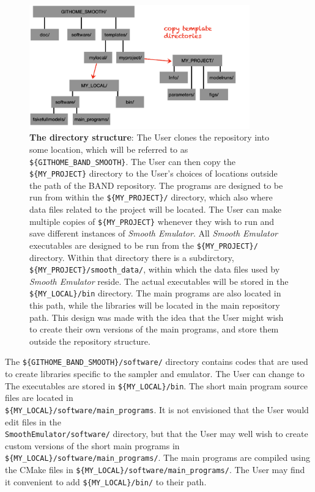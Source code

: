 \documentclass[UserManual.tex]{subfiles}
\begin{document}
\begin{figure}
\centerline{\includegraphics[width = 0.85\textwidth]{figs/directorystructure}}
\caption{{\bf The directory structure}: The User clones the repository into some location, which will be referred to as {\tt \$\{\tt GITHOME\_BAND\_SMOOTH\}}. The User can then copy the {\tt  \$\{MY\_PROJECT\}} directory to the User's choices of locations outside the path of the BAND repository.  The programs are designed to be run from within the {\tt \$\{MY\_PROJECT\}/} directory, which also where data files related to the project will be located. The User can make multiple copies of {\tt  \$\{MY\_PROJECT\}} whenever they wish to run and save different instances of {\it Smooth Emulator}. All {\it Smooth Emulator} executables are designed to be run from the {\tt \$\{MY\_PROJECT\}/} directory. Within that directory there is a subdirctory, {\tt  \$\{MY\_PROJECT\}/smooth\_data/}, within which the data files used by {\it Smooth Emulator} reside. The actual executables will be stored in the {\tt  \$\{MY\_LOCAL\}/bin} directory. The main programs are also located in this path, while the libraries will be located in the main repository path. This design was made with the idea that the User might wish to create their own versions of the main programs, and store them outside the repository structure.
}
\end{figure}

The {\tt \$\{GITHOME\_BAND\_SMOOTH\}/software/} directory contains codes that are used to create libraries specific to the sampler and emulator. The User can change to The executables are stored in {\tt \$\{MY\_LOCAL\}/bin}. The short main program source files are located in\\{\tt \$\{MY\_LOCAL\}/software/main\_programs}. It is not envisioned that the User would edit files in the\\{\tt SmoothEmulator/software/} directory, but that the User may well wish to create custom versions of the short main programs in {\tt \$\{MY\_LOCAL\}/software/main\_programs/}. The main programs are compiled using the CMake files in {\tt \$\{MY\_LOCAL\}/software/main\_programs/}. The User may find it convenient to add {\tt \$\{MY\_LOCAL\}/bin/} to their path.
\end{document}
